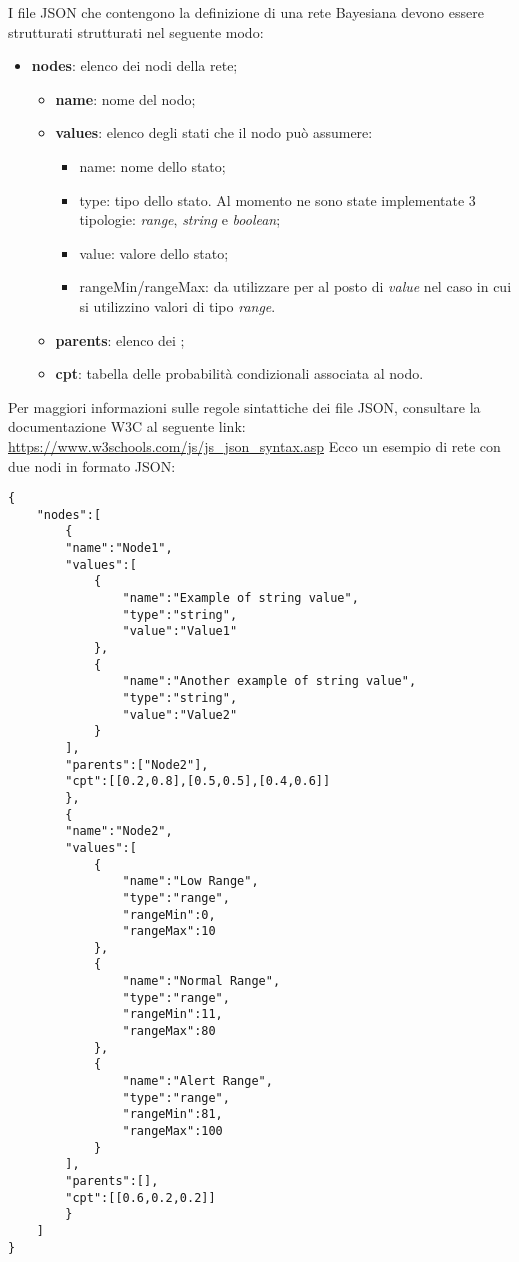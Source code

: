 \pagebreak
{}
I file JSON che contengono la definizione di una rete Bayesiana devono essere strutturati strutturati nel seguente modo:
\begin{itemize}
	\item \textbf{nodes}: elenco dei nodi della rete;
	\begin{itemize}
		\item \textbf{name}: nome del nodo;
		\item \textbf{values}: elenco degli stati che il nodo può assumere:
		\begin{itemize}
			\item name: nome dello stato;
			\item type: tipo dello stato. Al momento ne sono state implementate 3 tipologie: \textit{range}, \textit{string} e \textit{boolean};
			\item value: valore dello stato;
			\item rangeMin/rangeMax: da utilizzare per al posto di \textit{value} nel caso in cui si utilizzino valori di tipo \textit{range}.
		\end{itemize}
		\item \textbf{parents}: elenco dei ;
		\item \textbf{cpt}:  tabella delle probabilità condizionali associata al nodo.
	\end{itemize}
\end{itemize}
Per maggiori informazioni sulle regole sintattiche dei file JSON, consultare la documentazione W3C al seguente link:
\\[0.2cm]
\hspace*{10mm}
\url{https://www.w3schools.com/js/js_json_syntax.asp}
\Spazio
Ecco un esempio di rete con due nodi in formato JSON:
\begin{lstlisting}
{
	"nodes":[
		{
		"name":"Node1",
		"values":[
			{
				"name":"Example of string value",
				"type":"string",
				"value":"Value1"
			},
			{
				"name":"Another example of string value",
				"type":"string",
				"value":"Value2"
			}
		],
		"parents":["Node2"],
		"cpt":[[0.2,0.8],[0.5,0.5],[0.4,0.6]]
		},
		{
		"name":"Node2",
		"values":[
			{
				"name":"Low Range",
				"type":"range",
				"rangeMin":0,
				"rangeMax":10
			},
			{
				"name":"Normal Range",
				"type":"range",
				"rangeMin":11,
				"rangeMax":80
			},
			{
				"name":"Alert Range",
				"type":"range",
				"rangeMin":81,
				"rangeMax":100
			}
		],
		"parents":[],
		"cpt":[[0.6,0.2,0.2]]
		}
	]
}
\end{lstlisting}


